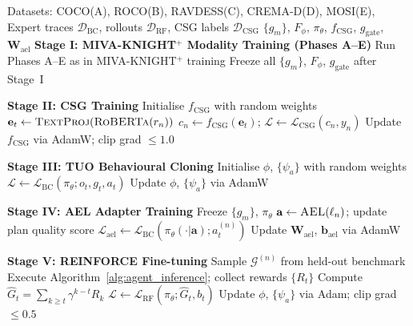 \documentclass[10pt,conference]{IEEEtran}
\theoremstyle{ieeethm}
\theoremstyle{ieeedef}
\theoremstyle{ieeeremark}
\begin{document}
\begin{algorithm}[!t]
\caption{MIVA-KNIGHT-AGENT: Full Training Procedure}
\label{alg:full_training}
\begin{algorithmic}[1]
\small
\Require Datasets: COCO(A), ROCO(B), RAVDESS(C), CREMA-D(D), MOSI(E),
\Statex \quad\quad\quad\; Expert traces $\mathcal{D}_\text{BC}$, rollouts $\mathcal{D}_\text{RF}$, CSG labels $\mathcal{D}_\text{CSG}$
\Ensure $\{g_m\}$, $F_\phi$, $\pi_\theta$, $f_\text{CSG}$, $g_\text{gate}$, $\mathbf{W}_\text{ael}$
\Statex \textbf{Stage I: MIVA-KNIGHT$^+$ Modality Training (Phases A--E)}
\State Run Phases A--E as in \textsc{MIVA-KNIGHT}$^+$ training
\State Freeze all $\{g_m\}$, $F_\phi$, $g_\text{gate}$ after Stage~I

\Statex \textbf{Stage II: CSG Training}
\State Initialise $f_\text{CSG}$ with random weights
    \State $\mathbf{e}_t \leftarrow \textsc{TextProj}(\textsc{RoBERTa}(r_n))$
    \State $c_n \leftarrow f_\text{CSG}(\mathbf{e}_t)$;\; $\mathcal{L} \leftarrow \mathcal{L}_\text{CSG}(c_n, y_n)$
    \State Update $f_\text{CSG}$ via AdamW; clip grad $\leq 1.0$
  \EndFor
\EndFor

\Statex \textbf{Stage III: TUO Behavioural Cloning}
\State Initialise $\phi$, $\{\psi_a\}$ with random weights
    \State $\mathcal{L} \leftarrow \mathcal{L}_\text{BC}(\pi_\theta; o_t, g_t, a_t)$ 
    \State Update $\phi$, $\{\psi_a\}$ via AdamW
  \EndFor
\EndFor

\Statex \textbf{Stage IV: AEL Adapter Training}
\State Freeze $\{g_m\}$, $\pi_\theta$
    \State $\mathbf{a} \leftarrow \textsc{AEL}(\ell_n)$;\; update plan quality score
    \State $\mathcal{L}_\text{ael} \leftarrow \mathcal{L}_\text{BC}(\pi_\theta(\cdot|\mathbf{a}); a_t^{(n)})$
    \State Update $\mathbf{W}_\text{ael}$, $\mathbf{b}_\text{ael}$ via AdamW
  \EndFor
\EndFor

\Statex \textbf{Stage V: REINFORCE Fine-tuning}
  \State Sample $\mathcal{G}^{(n)}$ from held-out benchmark
  \State Execute Algorithm~\ref{alg:agent_inference}; collect rewards $\{R_t\}$
  \State Compute $\hat{G}_t = \sum_{k \geq t} \gamma^{k-t} R_k$
  \State $\mathcal{L} \leftarrow \mathcal{L}_\text{RF}(\pi_\theta; \hat{G}_t, b_t)$ 
  \State Update $\phi$, $\{\psi_a\}$ via Adam; clip grad $\leq 0.5$
\EndFor
\end{algorithmic}
\end{algorithm}
\end{document}
